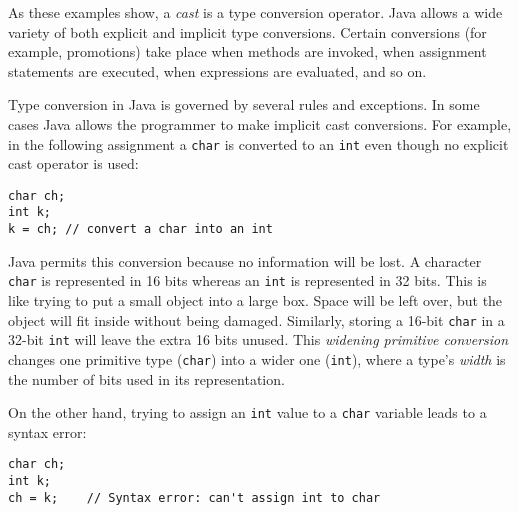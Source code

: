 \noindent As these examples show, a {\it cast} is a type conversion operator.
Java allows a wide variety of both explicit and implicit type
conversions.  Certain conversions (for example, promotions) take place
when methods are invoked, when assignment statements are executed,
when expressions are evaluated, and so on.

Type conversion in Java is governed by several rules
and exceptions. In some cases Java allows the programmer to make
implicit cast conversions. For example, in the following assignment
a {\tt char} is converted to an {\tt int} even though no
explicit cast operator is used:

\begin{jjjlisting}
\begin{lstlisting}
char ch;
int k;
k = ch; // convert a char into an int
\end{lstlisting}
\end{jjjlisting}

\noindent Java permits this conversion because no information will be lost.  A
character {\tt char} is represented in 16 bits whereas an {\tt int} is
represented in 32 bits.  This is like trying to put a small object
into a large box. Space will be left over, but the object will fit
inside without being damaged. Similarly, storing a 16-bit {\tt char}
in a 32-bit {\tt int} will leave the extra 16 bits unused. This {\it
widening primitive conversion} changes one primitive type ({\tt char})
into a wider one ({\tt int}), where a type's {\it
width} is the number of bits used in its representation.

On the other hand, trying to assign an {\tt int} value
to a {\tt char} variable leads to a syntax error:

\begin{jjjlisting}
\begin{lstlisting}
char ch;
int k;
ch = k;    // Syntax error: can't assign int to char
\end{lstlisting}
\end{jjjlisting}

